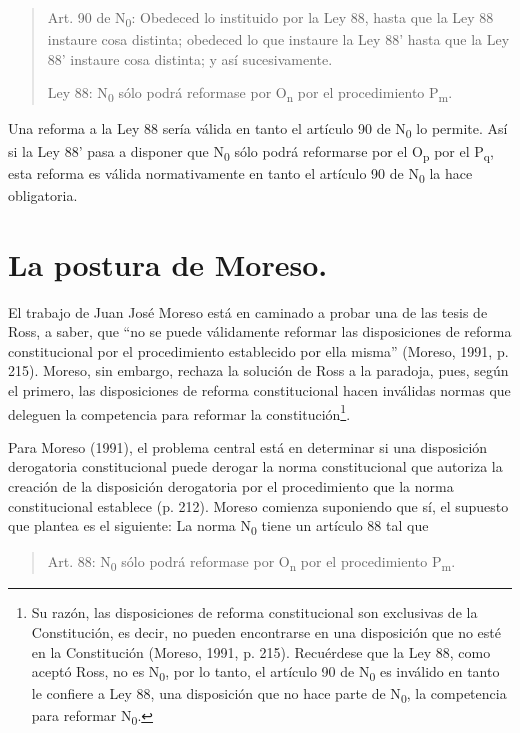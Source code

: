 \documentclass[]{book}
\begin{document}
\begin{quote}
Art. 90 de N\textsubscript{0}: Obedeced lo instituido por la Ley 88,
hasta que la Ley 88 instaure cosa distinta; obedeced lo que instaure la
Ley 88' hasta que la Ley 88' instaure cosa distinta; y así
sucesivamente.

Ley 88: N\textsubscript{0} sólo podrá reformase por O\textsubscript{n}
por el procedimiento P\textsubscript{m}.
\end{quote}

Una reforma a la Ley 88 sería válida en tanto el artículo 90 de
N\textsubscript{0} lo permite. Así si la Ley 88' pasa a disponer que
N\textsubscript{0} sólo podrá reformarse por el O\textsubscript{p} por
el P\textsubscript{q}, esta reforma es válida normativamente en tanto el
artículo 90 de N\textsubscript{0} la hace obligatoria.

\section*{La postura de Moreso.}

El trabajo de Juan José Moreso está en caminado a probar una de las
tesis de Ross, a saber, que ``no se puede válidamente reformar las
disposiciones de reforma constitucional por el procedimiento establecido
por ella misma'' (Moreso, 1991, p. 215). Moreso, sin embargo, rechaza la
solución de Ross a la paradoja, pues, según el primero, las
disposiciones de reforma constitucional hacen inválidas normas que
deleguen la competencia para reformar la constitución\footnote{Su razón,
  las disposiciones de reforma constitucional son exclusivas de la
  Constitución, es decir, no pueden encontrarse en una disposición que
  no esté en la Constitución (Moreso, 1991, p. 215). Recuérdese que la
  Ley 88, como aceptó Ross, no es N\textsubscript{0}, por lo tanto, el
  artículo 90 de N\textsubscript{0} es inválido en tanto le confiere a
  Ley 88, una disposición que no hace parte de N\textsubscript{0}, la
  competencia para reformar N\textsubscript{0}.}.

Para Moreso (1991), el problema central está en determinar si una
disposición derogatoria constitucional puede derogar la norma
constitucional que autoriza la creación de la disposición derogatoria
por el procedimiento que la norma constitucional establece (p. 212).
Moreso comienza suponiendo que sí, el supuesto que plantea es el
siguiente: La norma N\textsubscript{0} tiene un artículo 88 tal que

\begin{quote}
Art. 88: N\textsubscript{0} sólo podrá reformase por O\textsubscript{n}
por el procedimiento P\textsubscript{m}.
\end{quote}
\end{document}
